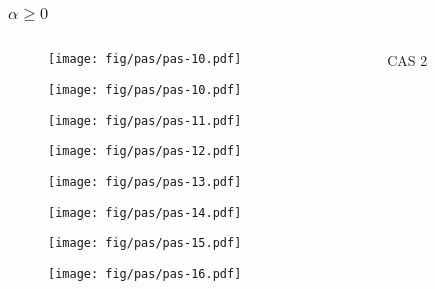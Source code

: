 \documentclass{beamer}
\begin{document}
\begin{frame}
\frametitle{$\alpha \geq 0$}
  \begin{columns}[t]
    \begin{column}{7cm}
      {
        \begin{figure}[h!]
          \centering
          \texttt{[image: fig/pas/pas-10.pdf]}
        \end{figure}
      }
      {
        \begin{figure}[h!]
          \centering
          \texttt{[image: fig/pas/pas-10.pdf]}
        \end{figure}
      }
      {
        \begin{figure}[h!]
          \centering
          \texttt{[image: fig/pas/pas-11.pdf]}
        \end{figure}
      }
      {
        \begin{figure}[h!]
          \centering
          \texttt{[image: fig/pas/pas-12.pdf]}
        \end{figure}
      }
      {
        \begin{figure}[h!]
          \centering
          \texttt{[image: fig/pas/pas-13.pdf]}
        \end{figure}
      }
      {
        \begin{figure}[h!]
          \centering
          \texttt{[image: fig/pas/pas-14.pdf]}
        \end{figure}
      }
      {
        \begin{figure}[h!]
          \centering
          \texttt{[image: fig/pas/pas-15.pdf]}
        \end{figure}
      }
      {
        \begin{figure}[h!]
          \centering
          \texttt{[image: fig/pas/pas-16.pdf]}
        \end{figure}
      }
    \end{column}
    \begin{column}{3cm}
      \begin{block}{}
        {
          \alert{CAS 2}
}
\end{block}
\end{column}
\end{columns}
\end{frame}
\end{document}
